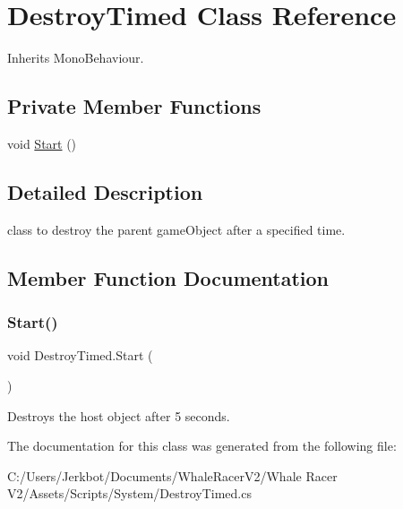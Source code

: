 \hypertarget{class_destroy_timed}{}\section{Destroy\+Timed Class Reference}
\label{class_destroy_timed}


Inherits Mono\+Behaviour.

\subsection*{Private Member Functions}
\begin{DoxyCompactItemize}
\item 
void \hyperlink{class_destroy_timed_aab77e96cf7524aaafa5f26fcdd5a1c4f}{Start} ()
\end{DoxyCompactItemize}


\subsection{Detailed Description}
class to destroy the parent game\+Object after a specified time. 



\subsection{Member Function Documentation}
\mbox{\label{class_destroy_timed_aab77e96cf7524aaafa5f26fcdd5a1c4f}} 
\subsubsection{\texorpdfstring{Start()}{Start()}}
{\footnotesize\ttfamily void Destroy\+Timed.\+Start (\begin{DoxyParamCaption}{ }\end{DoxyParamCaption})\hspace{0.3cm}{\ttfamily [private]}}



Destroys the host object after 5 seconds. 



The documentation for this class was generated from the following file\+:\begin{DoxyCompactItemize}
\item 
C\+:/\+Users/\+Jerkbot/\+Documents/\+Whale\+Racer\+V2/\+Whale Racer V2/\+Assets/\+Scripts/\+System/Destroy\+Timed.\+cs\end{DoxyCompactItemize}
